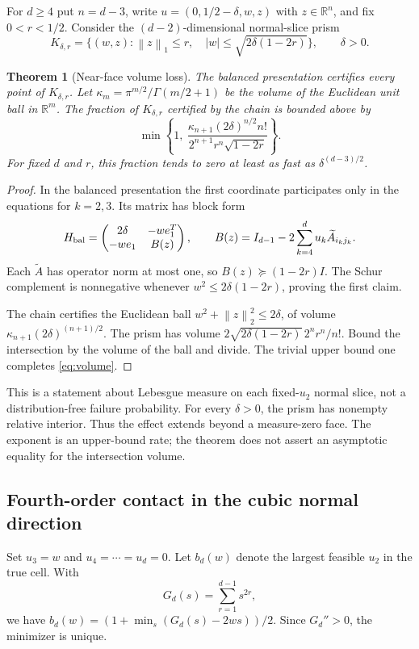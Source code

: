 \documentclass[11pt]{article}
\newtheorem{theorem}{Theorem}[section]
\theoremstyle{definition}\newtheorem{definition}[theorem]{Definition}
\theoremstyle{remark}\newtheorem{remark}[theorem]{Remark}
\newcommand{\R}{\mathbb{R}}
\newcommand{\norm}[1]{\left\lVert#1\right\rVert}
\begin{document}
For $d\ge4$ put $n=d-3$, write $u=(0,1/2-\delta,w,z)$ with $z\in\R^n$, and fix $0<r<1/2$. Consider the $(d-2)$-dimensional normal-slice prism
\begin{equation}\label{eq:prism}
 K_{\delta,r}=\{(w,z):\norm{z}_1\le r,\quad |w|\le\sqrt{2\delta(1-2r)}\},\qquad\delta>0.
\end{equation}

\begin{theorem}[Near-face volume loss]\label{thm:volume}
The balanced presentation certifies every point of $K_{\delta,r}$. Let $\kappa_m=\pi^{m/2}/\Gamma(m/2+1)$ be the volume of the Euclidean unit ball in $\R^m$. The fraction of $K_{\delta,r}$ certified by the chain is bounded above by
\begin{equation}\label{eq:volume}
 \min\left\{1,\ \frac{\kappa_{n+1}(2\delta)^{n/2}n!}
 {2^{n+1}r^n\sqrt{1-2r}}\right\}.
\end{equation}
For fixed $d$ and $r$, this fraction tends to zero at least as fast as $\delta^{(d-3)/2}$.
\end{theorem}
\begin{proof}
In the balanced presentation the first coordinate participates only in the equations for $k=2,3$. Its matrix has block form
\[
 H_{\rm bal}=\begin{pmatrix}2\delta&-we_1^T\\-we_1&B(z)\end{pmatrix},\qquad
 B(z)=I_{d-1}-2\sum_{k=4}^d u_k\widetilde A_{i_kj_k}.
\]
Each $\widetilde A$ has operator norm at most one, so $B(z)\succeq(1-2r)I$. The Schur complement is nonnegative whenever $w^2\le2\delta(1-2r)$, proving the first claim.

The chain certifies the Euclidean ball $w^2+\norm{z}_2^2\le2\delta$, of volume $\kappa_{n+1}(2\delta)^{(n+1)/2}$. The prism has volume $2\sqrt{2\delta(1-2r)}\,2^nr^n/n!$. Bound the intersection by the volume of the ball and divide. The trivial upper bound one completes \eqref{eq:volume}.
\end{proof}

This is a statement about Lebesgue measure on each fixed-$u_2$ normal slice, not a distribution-free failure probability. For every $\delta>0$, the prism has nonempty relative interior. Thus the effect extends beyond a measure-zero face. The exponent is an upper-bound rate; the theorem does not assert an asymptotic equality for the intersection volume.

\subsection{Fourth-order contact in the cubic normal direction}
Set $u_3=w$ and $u_4=\cdots=u_d=0$. Let $b_d(w)$ denote the largest feasible $u_2$ in the true cell. With
\begin{equation}
 G_d(s)=\sum_{r=1}^{d-1}s^{2r},
\end{equation}
we have $b_d(w)=(1+\min_s(G_d(s)-2ws))/2$. Since $G_d''>0$, the minimizer is unique.
\end{document}
